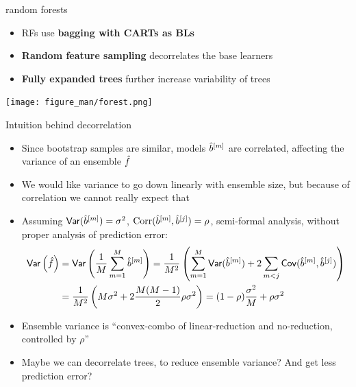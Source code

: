 \documentclass[11pt,compress,t,notes=noshow, xcolor=table]{beamer}
\begin{document}
\begin{vbframe}{random forests }


\begin{itemize}
\item RFs use \textbf{bagging with CARTs as BLs} %
\item \textbf{Random feature sampling} decorrelates the base learners
\item \textbf{Fully expanded trees} further increase variability of trees
\end{itemize}

\lz

\begin{center}
\texttt{[image: figure\_man/forest.png]}
\end{center}

\end{vbframe}


\begin{vbframe}{Intuition behind decorrelation}
\begin{itemize}
  \item Since bootstrap samples are similar, models $\hat{b}^{[m]}$ are correlated, affecting the variance of an ensemble $\hat{f}$
  \item We would like variance to go down linearly with ensemble size, but because of correlation we cannot really expect that
  \item Assuming $\mathsf{Var}(\hat{b}^{[m]}) = \sigma^2$, $\text{Corr}(\hat{b}^{[m]}, \hat{b}^{[j]}) = \rho$, semi-formal analysis,
    without proper analysis of prediction error:
\begin{align*}
\mathsf{Var}\left(\hat{f}\right) &= \mathsf{Var}\left(\frac{1}{M} \sum_{m=1}^{M} \hat{b}^{[m]} \right) = \frac{1}{M^2} \left( \sum_{m=1}^{M} \mathsf{Var}(\hat{b}^{[m]}) + 2 \sum_{m < j} \mathsf{Cov}(\hat{b}^{[m]}, \hat{b}^{[j]}) \right) \\
&= \frac{1}{M^2} \left( M \sigma^2 + 2 \frac{M(M-1)}{2}\rho \sigma^2 \right) = (1-\rho)\frac{\sigma^2}{M} + \rho \sigma^2
\end{align*}

\item Ensemble variance is ``convex-combo of linear-reduction and no-reduction, controlled by $\rho$''
\item Maybe we can decorrelate trees, to reduce ensemble variance? And get less prediction error?
\end{itemize}
\end{vbframe}
\end{document}
